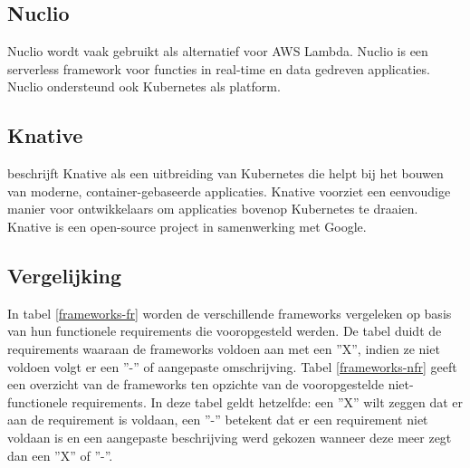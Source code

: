 \subsection{Nuclio}
Nuclio wordt vaak gebruikt als alternatief voor AWS Lambda. Nuclio is een serverless framework voor functies in real-time en data gedreven applicaties. Nuclio ondersteund ook Kubernetes als platform. \autocite{Nuclio2019}

\subsection{Knative}
\textcite{Pivotal2019} beschrijft Knative als een uitbreiding van Kubernetes die helpt bij het bouwen van moderne, container-gebaseerde applicaties. Knative voorziet een eenvoudige manier voor ontwikkelaars om applicaties bovenop Kubernetes te draaien. Knative is een open-source project in samenwerking met Google.

\subsection{Vergelijking}
In tabel \ref{frameworks-fr} worden de verschillende frameworks vergeleken op basis van hun functionele requirements die vooropgesteld  werden.  De tabel duidt de requirements waaraan de frameworks voldoen aan met een ''X'', indien ze niet voldoen volgt er een ''-'' of aangepaste omschrijving. Tabel \ref{frameworks-nfr} geeft een overzicht van de frameworks ten opzichte van de vooropgestelde niet-functionele requirements. In deze tabel geldt hetzelfde: een ''X'' wilt zeggen dat er aan de requirement is voldaan, een ''-'' betekent dat er een requirement niet voldaan is en een aangepaste beschrijving werd gekozen wanneer deze meer zegt dan een ''X'' of ''-''.

